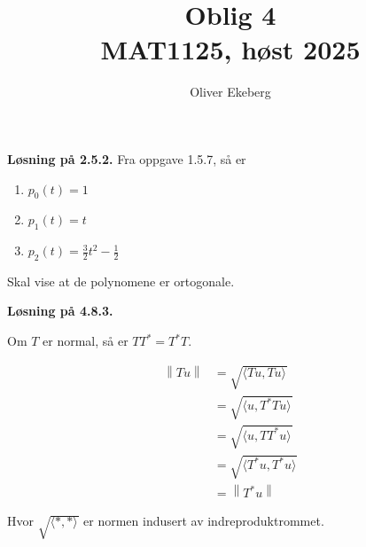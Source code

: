 \documentclass[a4paper,norsk]{article}
\title{Oblig 4 \\ MAT1125, høst 2025}
\author{Oliver Ekeberg}
\newenvironment{oppgave}[1]%
	{\trivlist{}\item\relax\textbf{Løsning på #1.}\medspace}%
	{\endtrivlist}
\begin{document}
\maketitle



\begin{oppgave}{2.5.2}
Fra oppgave 1.5.7, så er 

\begin{enumerate}
    \item $ p_0(t) = 1 $
    \item $ p_1(t) = t$
    \item $ p_2(t) = \frac{ 3 }{ 2 }t^2 - \frac{ 1 }{ 2 }$   
\end{enumerate}

Skal vise at de polynomene er ortogonale.



\end{oppgave}

\begin{oppgave}{4.8.3}

Om $ T $ er normal, så er $ T T^* = T^* T $. 

\begin{align*}
    \left\lVert Tu \right\rVert  &= \sqrt{ 
    \langle Tu, Tu \rangle_{  } } \\
    &= \sqrt{ \langle u, T^*Tu \rangle_{  }  }\\  
    &= \sqrt{ \langle u, TT^*u \rangle_{  }  } \\
    &= \sqrt{ \langle T^*u, T^*u \rangle_{  }} \\
    &= \left\lVert T^*u \right\rVert  
\end{align*}

Hvor $ \sqrt{ \langle *, * \rangle_{  } } $ er normen indusert av indreproduktrommet.
 
\end{oppgave}
\end{document}

